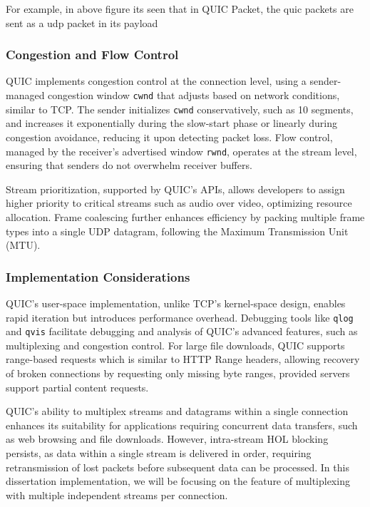 For example, in above figure \cite{marx2021-http3} its seen that in QUIC Packet, the quic packets are sent as a udp packet in its payload


\subsubsection{Congestion and Flow Control}

QUIC implements congestion control at the connection level, using a sender-managed congestion window \texttt{cwnd} that adjusts based on network conditions, similar to TCP. The sender initializes \texttt{cwnd} conservatively, such as 10 segments, and increases it exponentially during the slow-start phase or linearly during congestion avoidance, reducing it upon detecting packet loss. Flow control, managed by the receiver’s advertised window \texttt{rwnd}, operates at the stream level, ensuring that senders do not overwhelm receiver buffers.

Stream prioritization, supported by QUIC’s APIs, allows developers to assign higher priority to critical streams such as audio over video, optimizing resource allocation. Frame coalescing further enhances efficiency by packing multiple frame types into a single UDP datagram, following the Maximum Transmission Unit (MTU).

\subsubsection{Implementation Considerations}

QUIC’s user-space implementation, unlike TCP’s kernel-space design, enables rapid iteration but introduces performance overhead. Debugging tools like \texttt{qlog} and \texttt{qvis} facilitate debugging and analysis of QUIC’s advanced features, such as multiplexing and congestion control. For large file downloads, QUIC supports range-based requests which is similar to HTTP Range headers, allowing recovery of broken connections by requesting only missing byte ranges, provided servers support partial content requests.

QUIC’s ability to multiplex streams and datagrams within a single connection enhances its suitability for applications requiring concurrent data transfers, such as web browsing and file downloads. However, intra-stream HOL blocking persists, as data within a single stream is delivered in order, requiring retransmission of lost packets before subsequent data can be processed. In this dissertation implementation, we will be focusing on the feature of multiplexing with multiple independent streams per connection.


